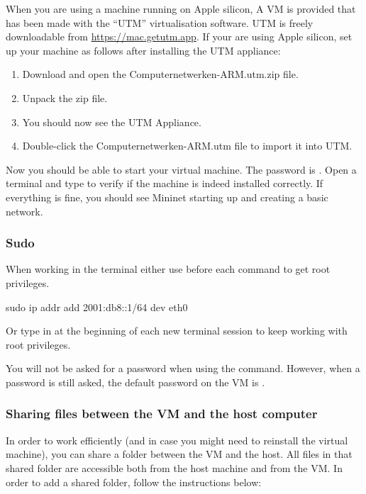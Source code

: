 When you are using a machine running on Apple silicon, A VM is provided that has been made with the ``UTM'' virtualisation software. UTM is freely downloadable from \url{https://mac.getutm.app}. If your are using Apple silicon, set up your machine as follows after installing the UTM appliance:
\begin{enumerate}
	\item Download and open the Computernetwerken-ARM.utm.zip file.
	\item Unpack the zip file.
	\item You should now see the UTM Appliance.
	\item Double-click the Computernetwerken-ARM.utm file to import it into UTM.
	\end{enumerate}

Now you should be able to start your virtual machine. The password is . Open a terminal and type  to verify if the machine is indeed installed correctly. If everything is fine, you should see Mininet starting up and creating a basic network.

\subsubsection{Sudo}
When working in the terminal either use  before each command to get root privileges.
\begin{cmdblock}[gobble=1]
	sudo ip addr add 2001:db8::1/64 dev eth0
\end{cmdblock}

Or type in  at the beginning of each new terminal session to keep working with root privileges.

You will not be asked for a password when using the  command. However, when a password is still asked, the default password on the VM is .

\subsubsection*{Sharing files between the VM and the host computer}
In order to work efficiently (and in case you might need to reinstall the virtual machine), you can share a folder between the VM and the host. All files in that shared folder are accessible both from the host machine and from the VM. In order to add a shared folder, follow the instructions below:

